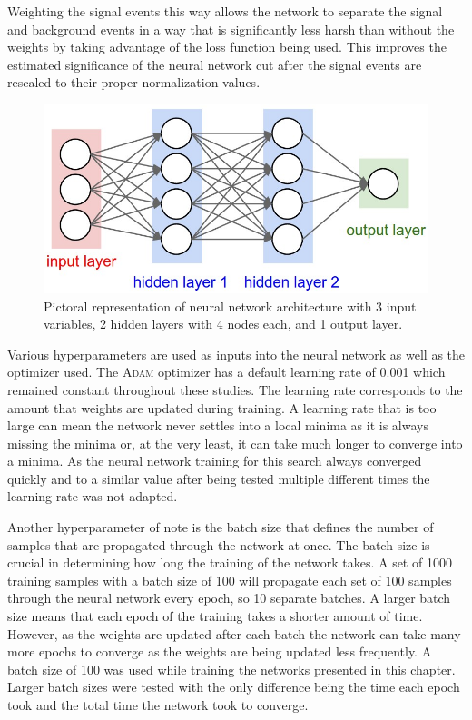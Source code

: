 Weighting the signal events this way allows the network to separate the signal and background events in a way that is significantly less harsh than without the weights by taking advantage of the loss function being used.  This improves the estimated significance of the neural network cut after the signal events are rescaled to their proper normalization values.  

\begin{figure}[h!]
	\centering
	\includegraphics[width=\columnwidth]{../ThesisImages/SearchStrategy/neural_net2.jpeg}
	\caption[Pictoral representation of neural network architecture with 3 input variables, 2 hidden layers with 4 nodes each, and 1 output layer.]{Pictoral representation of neural network architecture with 3 input variables, 2 hidden layers with 4 nodes each, and 1 output layer\cite{NNImage}.}
	\label{fig:NNArch}
\end{figure}

Various hyperparameters are used as inputs into the neural network as well as the optimizer used.  The \textsc{Adam} optimizer has a default learning rate of 0.001 which remained constant throughout these studies.   The learning rate corresponds to the amount that weights are updated during training.  A learning rate that is too large can mean the network never settles into a local minima as it is always missing the minima or, at the very least, it can take much longer to converge into a minima.  As the neural network training for this search always converged quickly and to a similar value after being tested multiple different times the learning rate was not adapted.  

Another hyperparameter of note is the batch size that defines the number of samples that are propagated through the network at once.  The batch size is crucial in determining how long the training of the network takes.  A set of 1000 training samples with a batch size of 100 will propagate each set of 100 samples through the neural network every epoch, so 10 separate batches.  A larger batch size means that each epoch of the training takes a shorter amount of time.  However, as the weights are updated after each batch the network can take many more epochs to converge as the weights are being updated less frequently.  A batch size of 100 was used while training the networks presented in this chapter.  Larger batch sizes were tested with the only difference being the time each epoch took and the total time the network took to converge.

